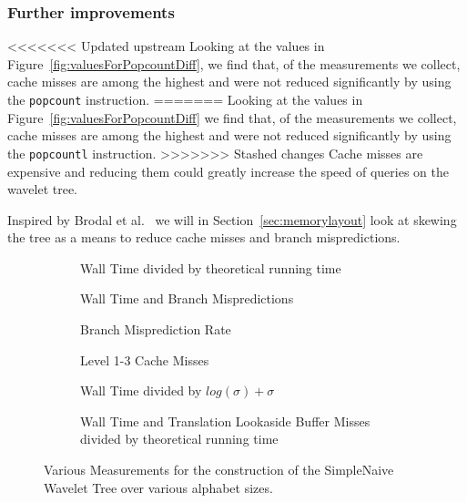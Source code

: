 \subsubsection{Further improvements}
<<<<<<< Updated upstream
Looking at the values in Figure~\ref{fig:valuesForPopcountDiff}, we find that, of the measurements we collect, cache misses are among the highest and were not reduced significantly by using the \texttt{popcount} instruction.
=======
Looking at the values in Figure~\ref{fig:valuesForPopcountDiff} we find that, of the measurements we collect, cache misses are among the highest and were not reduced significantly by using the \texttt{popcountl} instruction.
>>>>>>> Stashed changes
Cache misses are expensive and reducing them could greatly increase the speed of queries on the wavelet tree.

Inspired by Brodal et al.~ we will in Section~\ref{sec:memorylayout} look at skewing the tree as a means to reduce cache misses and branch mispredictions.



\begin{figure}\tiny
	\begin{subfigure}{0.48\textwidth}
		
		\caption{Wall Time divided by theoretical running time}
		\label{fig:naiveIntegerAlphabetSize_WallTime}
	\end{subfigure}
	\hfill
	\begin{subfigure}{0.48\textwidth}
		
		\caption{Wall Time and Branch Mispredictions}
		\label{fig:naiveIntegerAlphabetSize_WallTime_BM}
	\end{subfigure}	
	
	\begin{subfigure}{0.48\textwidth}
		
		\caption{Branch Misprediction Rate}
		\label{fig:naiveIntegerAlphabetSize_BMRate}
	\end{subfigure}
	\hfill
	\begin{subfigure}{0.48\textwidth}
		
		\caption{Level 1-3 Cache Misses}
		\label{fig:naiveIntegerAlphabetSize_CM}
	\end{subfigure}
	
	\begin{subfigure}{0.48\textwidth}
		
		\caption{Wall Time divided by $log(\sigma) + \sigma$}
		\label{fig:naiveIntegerAlphabetSize_WallTime_plusSigma}
	\end{subfigure}
	\hfill
	\begin{subfigure}{0.48\textwidth}
		
		\caption{Wall Time and Translation Lookaside Buffer Misses divided by theoretical running time}
		\label{fig:naiveIntegerAlphabetSize_WallTime_TLB}
	\end{subfigure}
	\caption{Various Measurements for the construction of the SimpleNaive Wavelet Tree over various alphabet sizes.}
	\label{fig:naiveIntegerAlphabetSize}
\end{figure}
\restoregeometry
\clearpage

